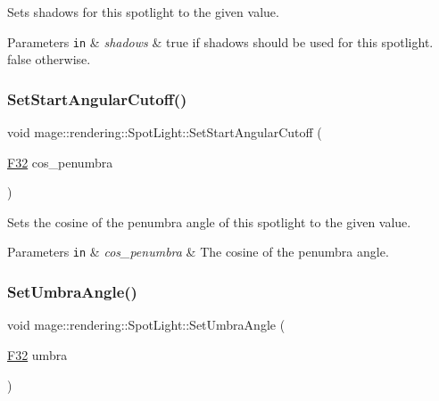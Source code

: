 Sets shadows for this spotlight to the given value.


\begin{DoxyParams}[1]{Parameters}
\mbox{\tt in}  & {\em shadows} & {\ttfamily true} if shadows should be used for this spotlight. {\ttfamily false} otherwise. \\
\hline
\end{DoxyParams}
\hypertarget{classmage_1_1rendering_1_1_spot_light_a01db83a4c9e64ff48dc4152359abec84}{}\label{classmage_1_1rendering_1_1_spot_light_a01db83a4c9e64ff48dc4152359abec84} 
\subsubsection{\texorpdfstring{Set\+Start\+Angular\+Cutoff()}{SetStartAngularCutoff()}}
{\footnotesize\ttfamily void mage\+::rendering\+::\+Spot\+Light\+::\+Set\+Start\+Angular\+Cutoff (\begin{DoxyParamCaption}\item[{\hyperlink{namespacemage_aa97e833b45f06d60a0a9c4fc22ae02c0}{F32}}]{cos\+\_\+penumbra }\end{DoxyParamCaption})\hspace{0.3cm}{\ttfamily [noexcept]}}

Sets the cosine of the penumbra angle of this spotlight to the given value.


\begin{DoxyParams}[1]{Parameters}
\mbox{\tt in}  & {\em cos\+\_\+penumbra} & The cosine of the penumbra angle. \\
\hline
\end{DoxyParams}
\hypertarget{classmage_1_1rendering_1_1_spot_light_a65c753804a53c6b9fc1c58bf036a75c1}{}\label{classmage_1_1rendering_1_1_spot_light_a65c753804a53c6b9fc1c58bf036a75c1} 
\subsubsection{\texorpdfstring{Set\+Umbra\+Angle()}{SetUmbraAngle()}}
{\footnotesize\ttfamily void mage\+::rendering\+::\+Spot\+Light\+::\+Set\+Umbra\+Angle (\begin{DoxyParamCaption}\item[{\hyperlink{namespacemage_aa97e833b45f06d60a0a9c4fc22ae02c0}{F32}}]{umbra }\end{DoxyParamCaption})\hspace{0.3cm}{\ttfamily [noexcept]}}

